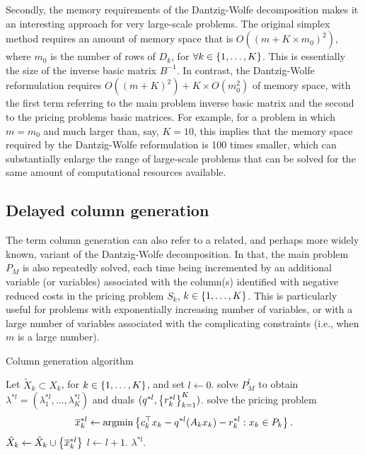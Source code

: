 Secondly, the memory requirements of the Dantzig-Wolfe decomposition makes it an interesting approach for very large-scale problems. The original simplex method requires an amount of memory space that is $O((m + K \times m_0)^2)$, where $m_0$ is the number of rows of $D_k$, for $\forall k \in \left\{ 1,\dots, K \right \}$. This is essentially the size of the inverse basic matrix $B^{-1}$. In contrast, the Dantzig-Wolfe reformulation requires $O((m + K)^2) + K \times O(m_0^2)$ of memory space, with the first term referring to the main problem inverse basic matrix and the second to the pricing problems basic matrices. For example, for a problem in which $m = m_0$ and much larger than, say, $K=10$, this implies that the memory space required by the Dantzig-Wolfe reformulation is 100 times smaller, which can substantially enlarge the range of large-scale problems that can be solved for the same amount of computational resources available.


\subsection{Delayed column generation}
 
The term column generation can also refer to a related, and perhaps more widely known, variant of the Dantzig-Wolfe decomposition. In that, the main problem $P_M$ is also repeatedly solved, each time being incremented by an additional variable (or variables) associated with the column(s) identified with negative reduced costs in the pricing problem $S_k$, $k \in \left\{ 1,\dots,K \right \}$. This is particularly useful for problems with exponentially increasing number of variables, or with a large number of variables associated with the complicating constraints (i.e., when $m$ is a large number).

\begin{algorithm}[h]
    \caption{Column generation algorithm} \label{p1c7:alg:CG}
    \begin{algorithmic}[1] %
    Let $\tilde{X}_k \subset X_k$, for $k \in \left\{ 1,\dots,K \right \}$, and set
    $l \gets 0$. 
    	\Repeat \label{Alg2:loop}
        \State solve $P_M^l$ to obtain $\lambda^{*l} = (\lambda_1^{*l},\dots, \lambda_K^{*l})$ and duals $(q^{*l}, \left\{ r_k^{*l} \right \}_{k=1}^K)$.
            \State solve the pricing problem
            $$\overline{x}^{*l}_k \gets \mathop{\rm argmin} \left\{ c_k^\top x_k - q^{*l}(A_kx_k) - r^{*l}_k : x_k \in P_k \right \}.
            $$
             $\tilde{X}_k \gets \tilde{X}_k \cup \left\{ \overline{x}^{*l}_k \right \}$ \label{p1c7:alg:CGcolgen}
            \EndIf  
        \EndFor
        \State $l \gets l + 1$.
     $\lambda^{*l}$.
    \end{algorithmic}
\end{algorithm}

